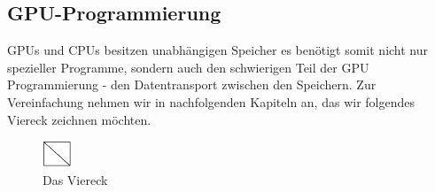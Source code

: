 \begin{Spacing}{\mylinespace}
\subsection{GPU-Programmierung}
GPUs und CPUs besitzen unabhängigen Speicher es benötigt somit nicht nur spezieller Programme, sondern auch den schwierigen Teil der GPU Programmierung - den Datentransport zwischen den Speichern.
Zur Vereinfachung nehmen wir in nachfolgenden Kapiteln an, das wir folgendes Viereck zeichnen möchten.

\begin{figure}[h!]
	\vspace*{100px}
	\includegraphics[height=30px]{graphics/quad.png}	
	\caption{Das Viereck}
	\label{fig:Viereck}
\end{figure}
\end{Spacing}
\clearpage
